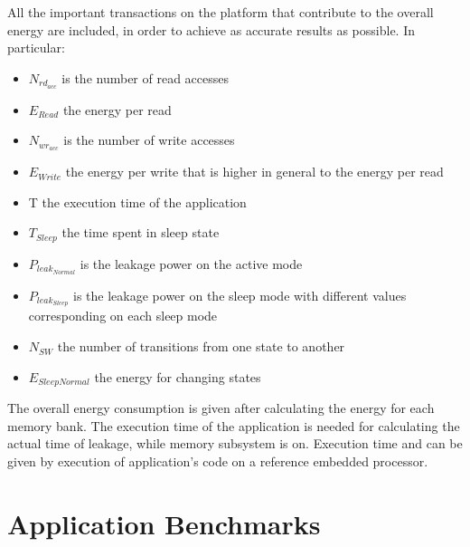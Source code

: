 \documentclass[a4paper,conference]{IEEEtran}
\begin{document}
All the important transactions on the platform that contribute to the overall energy are included, in order to achieve as accurate results as possible. In particular:
\begin{itemize}
\item $N_{rd_{acc}}$ is the number of read accesses
\item $E_{Read}$ the energy per read
\item $N_{wr_{acc}}$ is the number of write accesses 
\item $E_{Write}$ the energy per write that is higher in general to the energy per read 
\item T the execution time of the application
\item $T_{Sleep}$ the time spent in sleep state
\item $P_{leak_{Normal}}$ is the leakage power on the active mode 
\item $P_{leak_{Sleep}}$ is the leakage power on the sleep mode with different values corresponding on each sleep mode 
\item $N_{SW}$ the number of transitions from one state to another
\item $E_{SleepNormal}$ the energy for changing states
\end{itemize}

 The overall energy consumption is given after calculating the energy for each memory bank. The execution time of the application is needed for calculating the actual time of leakage, while memory subsystem is on. Execution time and can be given by execution of application's code on a reference embedded processor.   
 
\section{Application Benchmarks}
\label{sec:applications}
\end{document}
